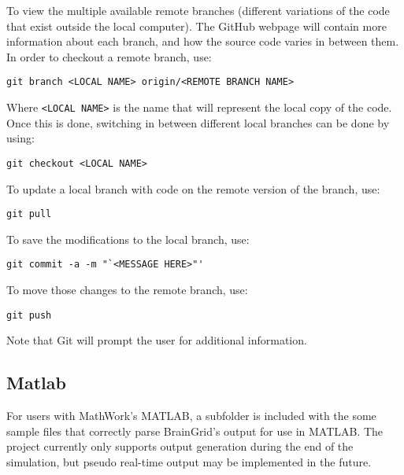 \noindent \mdseries To view the multiple available remote branches (different variations of the code that exist outside the local computer). The GitHub webpage will contain more information about each branch, and how the source code varies in between them. In order to checkout a remote branch, use:
\begin{verbatim}
git branch <LOCAL NAME> origin/<REMOTE BRANCH NAME>
\end{verbatim}

\noindent \mdseries Where \verb|<LOCAL NAME>| is the name that will represent the local copy of the code. Once this is done, switching in between different local branches can be done by using:
\begin{verbatim}
git checkout <LOCAL NAME> 
\end{verbatim}

\noindent \mdseries To update a local branch with code on the remote version of the branch, use:
\begin{verbatim}
git pull
\end{verbatim}

\noindent \mdseries To save the modifications to the local branch, use:
\begin{verbatim}
git commit -a -m "`<MESSAGE HERE>"'
\end{verbatim}

\noindent \mdseries To move those changes to the remote branch, use:
\begin{verbatim}
git push
\end{verbatim}

\noindent \mdseries Note that Git will prompt the user for additional information.

\subsection{Matlab}
\mdseries For users with MathWork's MATLAB, a subfolder is included with the some sample files that correctly parse BrainGrid's output for use in MATLAB. The project currently only supports output generation during the end of the simulation, but pseudo real-time output may be implemented in the future.
\pagebreak
